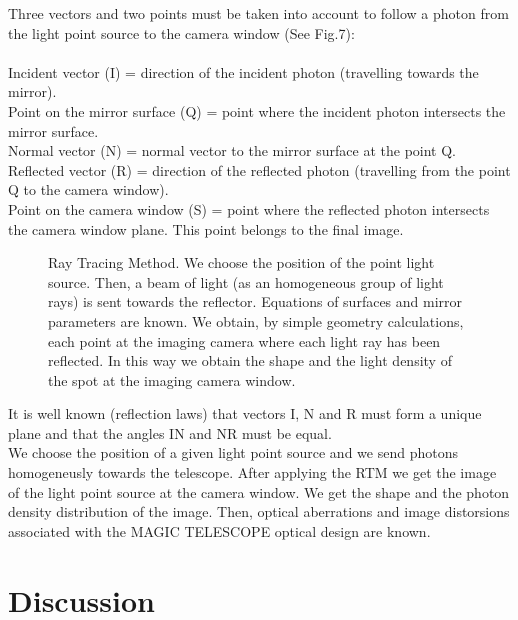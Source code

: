 {\vspace{0.2cm}

Three vectors and two points must be taken into account to follow a photon from the light point source to the camera window (See Fig.7):\\
\\
Incident vector (I) = direction of the incident photon (travelling towards the mirror).\\
Point on the mirror surface (Q) = point where the incident photon intersects the mirror surface. \\
Normal vector (N) = normal vector to the mirror surface at the point Q.\\
Reflected vector (R) = direction of the reflected photon (travelling from the point Q to the camera window).\\
Point on the camera window (S) = point where the reflected photon intersects the camera window plane. This point belongs to the final image.\\

   \begin{figure}[h]\centering
   \leavevmode
   \epsfxsize=9cm
   \caption{\tiny{Ray Tracing Method. We choose the position of the point light source. Then, a beam of light (as an homogeneous group of light rays)
is sent towards the reflector. Equations of surfaces and mirror parameters are known. We obtain, by simple geometry calculations, each point at the imaging camera where each light ray has been reflected. In this way we obtain the shape and the light density of the spot at the imaging camera window.}}
   \end{figure}
It is well known (reflection laws) that vectors I, N and R must form a unique plane and that the angles IN and NR must be equal.\\

We choose the position of a given light point source and we send photons homogeneusly towards the telescope. After applying the RTM we get the image of the light point source at the camera window. We get the shape and the photon density distribution of the image. Then, optical aberrations and image distorsions associated with the MAGIC TELESCOPE optical design are known.




}

\section{Discussion}

